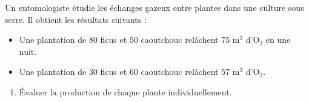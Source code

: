 \begin{exo}{}
	Un entomologiste étudie les échanges gazeux entre plantes dans une culture sous serre. Il obtient les résultats suivants :
	\begin{itemize}
		\item Une plantation de $80$ ficus et $50$ caoutchouc relâchent $75\text{ m}^3$ d'O$_2$ en une nuit.
		\item Une plantation de $30$ ficus et $60$ caoutchouc relâchent $57\text{ m}^3$ d'O$_2$.
	\end{itemize}
	\begin{enumerate}
		\item Évaluer la production de chaque plante individuellement.
	\end{enumerate}
\end{exo}
